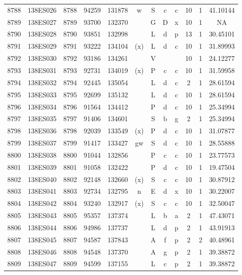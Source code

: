 \begin{tabular}{|*{12}{c|}}
8788 & 138ES026 & 8788 & 94259 & 131878 & w & S & c & c & 10 & 1 & 41.10144 \\ 
8789 & 138ES027 & 8789 & 93700 & 132370 &  & G & D & x & 10 & 1 & NA \\ 
8790 & 138ES028 & 8790 & 93851 & 132998 &  & L & d & p & 13 & 1 & 30.45101 \\ 
8791 & 138ES029 & 8791 & 93222 & 134104 & (x) & L & d & c & 10 & 1 & 31.89993 \\ 
8792 & 138ES030 & 8792 & 93186 & 134261 &  & V &  &  & 10 & 1 & 24.12277 \\ 
8793 & 138ES031 & 8793 & 92731 & 134019 & (x) & P & c & c & 10 & 1 & 31.59958 \\ 
8794 & 138ES032 & 8794 & 92445 & 135054 &  & L & d & c & 2 & 1 & 28.61594 \\ 
8795 & 138ES033 & 8795 & 92699 & 135132 &  & L & d & c & 10 & 1 & 28.61594 \\ 
8796 & 138ES034 & 8796 & 91564 & 134412 &  & P & d & c & 10 & 1 & 25.34994 \\ 
8797 & 138ES035 & 8797 & 91406 & 134601 &  & S & b & g & 2 & 1 & 25.34994 \\ 
8798 & 138ES036 & 8798 & 92039 & 133549 & (x) & P & d & c & 10 & 1 & 31.07877 \\ 
8799 & 138ES037 & 8799 & 91417 & 133427 & gw & S & d & c & 10 & 1 & 28.55888 \\ 
8800 & 138ES038 & 8800 & 91044 & 132856 &  & P & c & c & 10 & 1 & 23.77573 \\ 
8801 & 138ES039 & 8801 & 91058 & 132422 &  & P & d & c & 10 & 1 & 19.47504 \\ 
8802 & 138ES040 & 8802 & 92148 & 132660 & (x) & S & c & c & 10 & 1 & 30.87912 \\ 
8803 & 138ES041 & 8803 & 92734 & 132795 & n & E & d & x & 10 & 1 & 30.22007 \\ 
8804 & 138ES042 & 8804 & 93240 & 132917 & (x) & S & c & c & 10 & 1 & 32.50047 \\ 
8805 & 138ES043 & 8805 & 95357 & 137374 &  & L & b & a & 2 & 1 & 47.43071 \\ 
8806 & 138ES044 & 8806 & 94986 & 137737 &  & L & d & p & 2 & 1 & 43.91913 \\ 
8807 & 138ES045 & 8807 & 94587 & 137843 &  & A & f & p & 2 & 2 & 40.48961 \\ 
8808 & 138ES046 & 8808 & 94548 & 137370 &  & A & g & p & 2 & 1 & 39.38872 \\ 
8809 & 138ES047 & 8809 & 94599 & 137155 &  & L & c & p & 2 & 1 & 39.38872 \\ 

\end{tabular}
